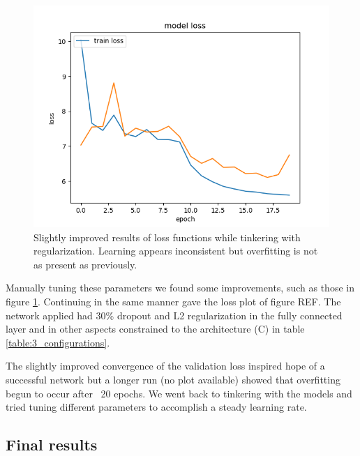 \documentclass{kthreport}
\begin{document}
\begin{figure}
  \includegraphics[width=\linewidth]{../images/improved_loss_1.png}
  \caption[]
  {\small Slightly improved results of loss functions while tinkering with regularization. Learning appears inconsistent but overfitting is not as present as previously.}
  \label{fig:loss_improved_1}
\end{figure}
Manually tuning these parameters we found some improvements, such as those in figure \ref{fig:loss_improved_1}. Continuing in the same manner gave the loss plot of figure REF. The network applied had 30\% dropout and L2 regularization in the fully connected layer and in other aspects constrained to the architecture (C) in table \ref{table:3_configurations}.

The slightly improved convergence of the validation loss inspired hope of a successful network but a longer run (no plot available) showed that overfitting begun to occur after ~20 epochs. We went back to tinkering with the models and tried tuning different parameters to accomplish a steady learning rate.

% 

\subsection{Final results}
\begin{table}
  
\end{table}
\end{document}
